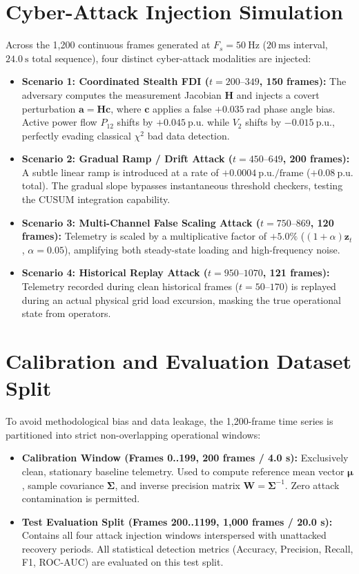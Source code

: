 \documentclass[11pt,a4paper]{report}
\begin{document}
\section{Cyber-Attack Injection Simulation}
Across the 1,200 continuous frames generated at $F_s = 50~\text{Hz}$ ($20~\text{ms}$ interval,
$24.0~\text{s}$ total sequence), four distinct cyber-attack modalities are injected:
\begin{itemize}
    \item \textbf{Scenario 1: Coordinated Stealth FDI ($t = 200\text{--}349$, 150 frames):}
    The adversary computes the measurement Jacobian $\boldsymbol{H}$ and injects a covert
    perturbation $\boldsymbol{a} = \boldsymbol{H}\boldsymbol{c}$, where $\boldsymbol{c}$ applies
    a false $+0.035~\text{rad}$ phase angle bias. Active power flow $P_{12}$ shifts by $+0.045~\text{p.u.}$
    while $V_2$ shifts by $-0.015~\text{p.u.}$, perfectly evading classical $\chi^2$ bad data detection.
    \item \textbf{Scenario 2: Gradual Ramp / Drift Attack ($t = 450\text{--}649$, 200 frames):}
    A subtle linear ramp is introduced at a rate of $+0.0004~\text{p.u./frame}$ ($+0.08~\text{p.u.}$ total).
    The gradual slope bypasses instantaneous threshold checkers, testing the CUSUM integration capability.
    \item \textbf{Scenario 3: Multi-Channel False Scaling Attack ($t = 750\text{--}869$, 120 frames):}
    Telemetry is scaled by a multiplicative factor of $+5.0\%$ ($(1 + \alpha)\boldsymbol{z}_t$, $\alpha = 0.05$),
    amplifying both steady-state loading and high-frequency noise.
    \item \textbf{Scenario 4: Historical Replay Attack ($t = 950\text{--}1070$, 121 frames):}
    Telemetry recorded during clean historical frames ($t = 50\text{--}170$) is replayed during an
    actual physical grid load excursion, masking the true operational state from operators.
\end{itemize}

\section{Calibration and Evaluation Dataset Split}
To avoid methodological bias and data leakage, the 1,200-frame time series is partitioned into
strict non-overlapping operational windows:
\begin{itemize}
    \item \textbf{Calibration Window (Frames 0..199, 200 frames / 4.0 s):} Exclusively clean,
    stationary baseline telemetry. Used to compute reference mean vector $\boldsymbol{\mu}$,
    sample covariance $\boldsymbol{\Sigma}$, and inverse precision matrix $\boldsymbol{W} = \boldsymbol{\Sigma}^{-1}$.
    Zero attack contamination is permitted.
    \item \textbf{Test Evaluation Split (Frames 200..1199, 1,000 frames / 20.0 s):} Contains all
    four attack injection windows interspersed with unattacked recovery periods. All statistical
    detection metrics (Accuracy, Precision, Recall, F1, ROC-AUC) are evaluated on this test split.
\end{itemize}
\end{document}
